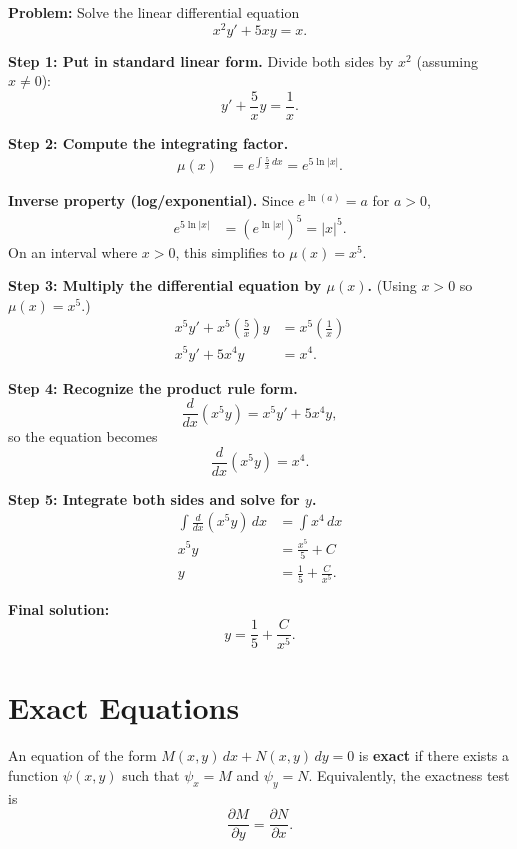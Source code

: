 \documentclass[11pt]{article}
\begin{document}
\noindent\textbf{Problem:} Solve the linear differential equation
\[
x^{2}y' + 5xy = x.
\]

\noindent\textbf{Step 1: Put in standard linear form.} Divide both sides by $x^{2}$ (assuming $x\neq 0$):
\[
y' + \frac{5}{x}y = \frac{1}{x}.
\]

\noindent\textbf{Step 2: Compute the integrating factor.}
\begin{align*}
\mu(x) &= e^{\int \frac{5}{x}\,dx}
      = e^{5\ln|x|}.
\end{align*}

\noindent\textbf{Inverse property (log/exponential).} Since $e^{\ln(a)}=a$ for $a>0$,
\begin{align*}
e^{5\ln|x|}
&= \left(e^{\ln|x|}\right)^{5}
= |x|^{5}.
\end{align*}
On an interval where $x>0$, this simplifies to $\mu(x)=x^{5}$.

\noindent\textbf{Step 3: Multiply the differential equation by $\mu(x)$.} (Using $x>0$ so $\mu(x)=x^{5}$.)
\begin{align*}
x^{5}y' + x^{5}\left(\frac{5}{x}\right)y &= x^{5}\left(\frac{1}{x}\right) \\
x^{5}y' + 5x^{4}y &= x^{4}.
\end{align*}

\noindent\textbf{Step 4: Recognize the product rule form.}
\[
\frac{d}{dx}\left(x^{5}y\right)=x^{5}y' + 5x^{4}y,
\]
so the equation becomes
\[
\frac{d}{dx}\left(x^{5}y\right)=x^{4}.
\]

\noindent\textbf{Step 5: Integrate both sides and solve for $y$.}
\begin{align*}
\int \frac{d}{dx}\left(x^{5}y\right)\,dx &= \int x^{4}\,dx \\
x^{5}y &= \frac{x^{5}}{5} + C \\
y &= \frac{1}{5} + \frac{C}{x^{5}}.
\end{align*}

\noindent\textbf{Final solution:}
\[
\boxed{\;y = \frac{1}{5} + \frac{C}{x^{5}}.\;}
\]

\newpage

\section{Exact Equations}

\noindent An equation of the form $M(x,y)\,dx + N(x,y)\,dy = 0$ is \textbf{exact} if there exists a function $\psi(x,y)$ such that
$\psi_x = M$ and $\psi_y = N$.
Equivalently, the exactness test is
\[
\frac{\partial M}{\partial y}=\frac{\partial N}{\partial x}.
\]
\end{document}
